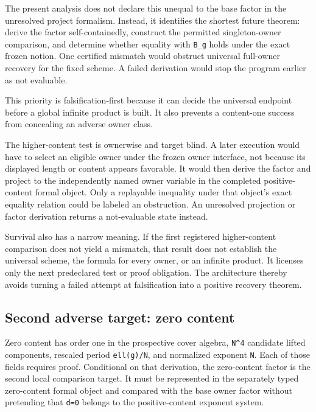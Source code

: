 \documentclass[11pt]{article}
\begin{document}
The present analysis does not declare this unequal to the base factor in the
unresolved project formalism. Instead, it identifies the shortest future
theorem: derive the factor self-containedly, construct the permitted
singleton-owner comparison, and determine whether equality with
\texttt{B\_g} holds under the exact frozen notion. One certified
mismatch would obstruct universal full-owner recovery for the fixed
scheme. A failed derivation would stop the program earlier as not
evaluable.

This priority is falsification-first because it can decide the universal
endpoint before a global infinite product is built. It also prevents a
content-one success from concealing an adverse owner class.

The higher-content test is ownerwise and target blind. A later execution
would have to select an eligible owner under the frozen owner interface,
not because its displayed length or content appears favorable. It would
then derive the factor and project to the independently named owner
variable in the completed positive-content formal object. Only a
replayable inequality under that object's exact equality relation could
be labeled an obstruction. An unresolved projection or factor
derivation returns a not-evaluable state instead.

Survival also has a narrow meaning. If the first registered
higher-content comparison does not yield a mismatch, that result does
not establish the universal scheme, the formula for every owner, or an
infinite product. It licenses only the next predeclared test or proof
obligation. The architecture thereby avoids turning a failed attempt at
falsification into a positive recovery theorem.

\hypertarget{43-second-adverse-target-zero-content}{%
\subsection{Second adverse target: zero
content}\label{43-second-adverse-target-zero-content}}

Zero content has order one in the prospective cover algebra,
\texttt{N\^{}4} candidate lifted components, rescaled period
\texttt{ell(g)/N}, and normalized exponent \texttt{N}. Each of those
fields requires proof. Conditional on that derivation, the zero-content
factor is the second local comparison target. It must be represented in
the separately typed zero-content formal object and compared with the
base owner factor without pretending that \texttt{d=0} belongs to the
positive-content exponent system.
\end{document}
